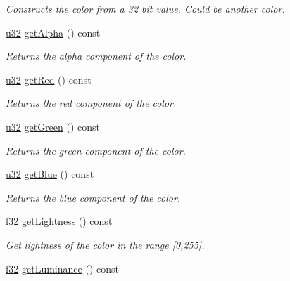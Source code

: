 \begin{DoxyCompactItemize}
\begin{DoxyCompactList}\small\item\em Constructs the color from a 32 bit value. Could be another color. \end{DoxyCompactList}\item 
\hyperlink{namespaceirr_a0416a53257075833e7002efd0a18e804}{u32} \hyperlink{classirr_1_1video_1_1SColor_a9647d09a9d4b9c6fb48a8fa1f2da425c}{get\+Alpha} () const 
\begin{DoxyCompactList}\small\item\em Returns the alpha component of the color. \end{DoxyCompactList}\item 
\hyperlink{namespaceirr_a0416a53257075833e7002efd0a18e804}{u32} \hyperlink{classirr_1_1video_1_1SColor_af10d2deaccbde5c958032ed9ec81b59f}{get\+Red} () const 
\begin{DoxyCompactList}\small\item\em Returns the red component of the color. \end{DoxyCompactList}\item 
\hyperlink{namespaceirr_a0416a53257075833e7002efd0a18e804}{u32} \hyperlink{classirr_1_1video_1_1SColor_ad604ba81e061b0bfe2ccb5f16e29124d}{get\+Green} () const 
\begin{DoxyCompactList}\small\item\em Returns the green component of the color. \end{DoxyCompactList}\item 
\hyperlink{namespaceirr_a0416a53257075833e7002efd0a18e804}{u32} \hyperlink{classirr_1_1video_1_1SColor_a26fdbde73081b35a1686f8d21a549544}{get\+Blue} () const 
\begin{DoxyCompactList}\small\item\em Returns the blue component of the color. \end{DoxyCompactList}\item 
\hyperlink{namespaceirr_a0277be98d67dc26ff93b1a6a1d086b07}{f32} \hyperlink{classirr_1_1video_1_1SColor_aa96bfc155c181104c61df9d58ad8be0f}{get\+Lightness} () const \hypertarget{classirr_1_1video_1_1SColor_aa96bfc155c181104c61df9d58ad8be0f}{}\label{classirr_1_1video_1_1SColor_aa96bfc155c181104c61df9d58ad8be0f}

\begin{DoxyCompactList}\small\item\em Get lightness of the color in the range \mbox{[}0,255\mbox{]}. \end{DoxyCompactList}\item 
\hyperlink{namespaceirr_a0277be98d67dc26ff93b1a6a1d086b07}{f32} \hyperlink{classirr_1_1video_1_1SColor_ad0a78b90a97e8444a1d12e93e7e929ba}{get\+Luminance} () const \hypertarget{classirr_1_1video_1_1SColor_ad0a78b90a97e8444a1d12e93e7e929ba}{}\label{classirr_1_1video_1_1SColor_ad0a78b90a97e8444a1d12e93e7e929ba}


\end{DoxyCompactItemize}
